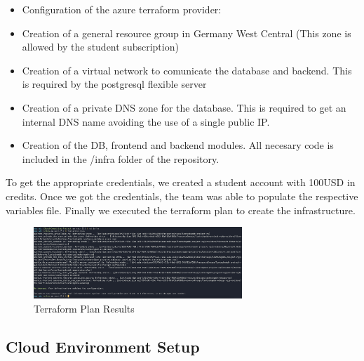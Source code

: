 \documentclass{llncs}
\begin{document}
\begin{itemize}

    \item Configuration of the azure terraform provider:
          
    \item Creation of a general resource group in Germany West Central (This zone is allowed by the student subscription)
          
    \item Creation of a virtual network to comunicate the database and backend. This is required by the postgresql flexible server
          
    \item Creation of a private DNS zone for the database. This is required to get an internal DNS name avoiding the use of a single public IP.
          
    \item Creation of the DB, frontend and backend modules. All necesary code is included in the /infra folder of the repository.
          
\end{itemize}

To get the appropriate credentials, we created a student account with 100USD in credits. Once we got the credentials,
the team was able to populate the respective variables file. Finally we executed the terraform plan to create the infrastructure.\\

\begin{figure}[htbp]
    \begin{center}
        \includegraphics[width=0.7\textwidth]{../images/terraform_plan.png}
        \vspace{0.01\textwidth}
        \caption{Terraform Plan Results}
        \label{TerraformPlan} %
    \end{center}
\end{figure}

\subsection{Cloud Environment Setup}
\end{document}
